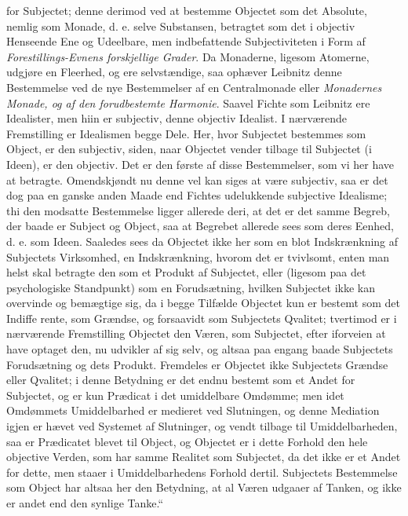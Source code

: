 \documentclass[11pt]{book}
\newcommand{\opage}[1]{\marginnote{\footnotesize\textit{[#1]}}}
\begin{document}
for Subjectet; denne derimod ved at bestemme Objectet som det
Absolute, nemlig som Monade, d. e. selve Substansen, betragtet som det
i objectiv Henseende Ene og Udeelbare, men indbefattende
Subjectiviteten i Form af \emph{Forestillings-Evnens forskjellige
Grader}. Da Monaderne, ligesom Atomerne, udgjøre en Fleerhed, og ere
selvstændige, saa ophæver Leibnitz denne Bestemmelse ved de nye
Bestemmelser af en Centralmonade eller \emph{Monadernes Monade, og af
den forudbestemte Harmonie}. Saavel Fichte som Leibnitz ere
Idealister, men hiin er subjectiv, denne objectiv Idealist. I
nærværende Fremstilling er Idealismen begge Dele. Her, hvor Subjectet
bestemmes som Object, er den subjectiv, siden, naar Objectet vender
tilbage til Subjectet (i Ideen), er den objectiv. Det er den første af
disse Bestemmelser, som vi her have at betragte. Omendskjøndt nu denne
vel kan siges at være subjectiv, saa er det dog paa en ganske anden
Maade end Fichtes udelukkende subjective Idealisme; thi den modsatte
Bestemmelse ligger allerede deri, at det er det samme Begreb, der
baade er Subject og Object, saa at Begrebet allerede sees som deres
Eenhed, d. e. som Ideen. Saaledes sees da Objectet ikke her som en
blot Indskrænkning af Subjectets Virksomhed, en Indskrænkning, hvorom
det er tvivlsomt, enten man helst skal betragte den som et Produkt af
Subjectet, eller (ligesom paa det psychologiske Standpunkt) som en
Forudsætning, hvilken Subjectet ikke kan overvinde og bemægtige sig,
da i begge Tilfælde Objectet kun er bestemt som det Indiffe\-%
\opage{39} \setcounter{footnote}{0}%
rente, som Grændse, og forsaavidt som Subjectets Qvalitet; tvertimod
er i nærværende Fremstilling Objectet den Væren, som Subjectet, efter
iforveien at have optaget den, nu udvikler af sig selv, og altsaa paa
engang baade Subjectets Forudsætning og dets Produkt. Fremdeles er
Objectet ikke Subjectets Grændse eller Qvalitet; i denne Betydning er
det endnu bestemt som et Andet for Subjectet, og er kun Prædicat i det
umiddelbare Omdømme; men idet Omdømmets Umiddelbarhed er medieret ved
Slutningen, og denne Mediation igjen er hævet ved Systemet af
Slutninger, og vendt tilbage til Umiddelbarheden, saa er Prædicatet
blevet til Object, og Objectet er i dette Forhold den hele objective
Verden, som har samme Realitet som Subjectet, da det ikke er et Andet
for dette, men staaer i Umiddelbarhedens Forhold dertil. Subjectets
Bestemmelse som Object har altsaa her den Betydning, at al Væren
udgaaer af Tanken, og ikke er andet end den synlige Tanke.“
\end{document}

